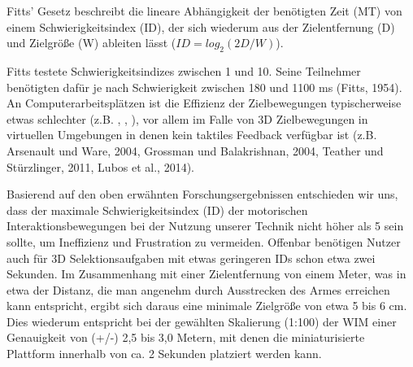 Fitts' Gesetz beschreibt die lineare Abhängigkeit der benötigten Zeit (MT) von einem
Schwierigkeitsindex (ID), der sich wiederum aus der Zielentfernung (D) und Zielgröße (W) ableiten lässt ($ID=log_2(2D/W)$).

Fitts testete Schwierigkeitsindizes zwischen 1 und 10. Seine Teilnehmer benötigten dafür je nach Schwierigkeit zwischen 180 und 1100 ms (Fitts, 1954). An Computerarbeitsplätzen ist die Effizienz der Zielbewegungen typischerweise etwas schlechter (z.B. \cite{Forlines}, \cite{MacKenzie:1992:FLR:1461854.1461857} \cite{MacKenzie:2008:FTS:1357054.1357308}, \cite{Wobbrock:2008:EMP:1357054.1357306}), vor 
allem im Falle von 3D Zielbewegungen in virtuellen Umgebungen in denen kein taktiles Feedback verfügbar ist (z.B. Arsenault und Ware, 2004, Grossman und Balakrishnan, 2004, Teather und Stürzlinger, 2011, Lubos et al., 2014).

Basierend auf den oben erwähnten Forschungsergebnissen entschieden wir
uns, dass der maximale Schwierigkeitsindex (ID) der motorischen
Interaktionsbewegungen bei der Nutzung unserer Technik nicht höher als 5 sein sollte, um Ineffizienz und Frustration zu vermeiden. Offenbar benötigen Nutzer auch für 3D
Selektionsaufgaben mit etwas geringeren IDs schon etwa zwei Sekunden. Im
Zusammenhang mit einer Zielentfernung von einem Meter, was in etwa der Distanz, die man angenehm durch Ausstrecken des Armes erreichen kann entspricht, ergibt sich daraus eine minimale Zielgröße von etwa 5 bis 6 cm. Dies wiederum entspricht bei der gewählten Skalierung (1:100) der WIM einer Genauigkeit von (+/-) 2,5 bis 3,0 Metern, mit denen die miniaturisierte Plattform innerhalb von ca. 2 Sekunden platziert werden kann.



